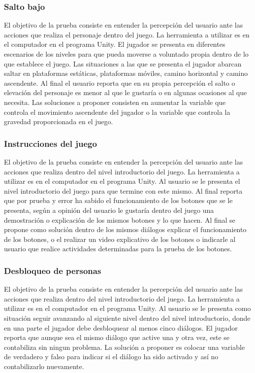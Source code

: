 \subsubsection{Salto bajo}
El objetivo de la prueba consiste en entender la percepción del usuario ante las acciones que realiza el personaje dentro del juego. La herramienta a utilizar es en el computador en el programa Unity. El jugador se presenta en diferentes escenarios de los niveles para que pueda moverse a voluntado propia dentro de lo que establece el juego. Las situaciones a las que se presenta el jugador abarcan saltar en plataformas estáticas, plataformas móviles, camino horizontal y camino ascendente. Al final el usuario reporta que en su propia percepción el salto o elevación del personaje es menor al que le gustaría o en algunas ocasiones al que necesita. Las soluciones a proponer consisten en aumentar la variable que controla el movimiento ascendente del jugador o la variable que controla la gravedad proporcionada en el juego.  
\subsubsection{Instrucciones del juego}
El objetivo de la prueba consiste en entender la percepción del usuario ante las acciones que realiza dentro del nivel introductorio del juego. La herramienta a utilizar es en el computador en el programa Unity. Al usuario se le presenta el nivel introductorio del juego para que termine con este mismo. Al final reporta que por prueba y error ha sabido el funcionamiento de los botones que se le presenta, según a opinión del usuario le gustaría dentro del juego una demostración o explicación de los mismos botones y lo que hacen. Al final se propone como solución dentro de los mismos diálogos explicar el funcionamiento de los botones, o el realizar un video explicativo de los botones o indicarle al usuario que realice actividades determinadas para la prueba de los botones. 
\subsubsection{Desbloqueo de personas}
El objetivo de la prueba consiste en entender la percepción del usuario ante las acciones que realiza dentro del nivel introductorio del juego. La herramienta a utilizar es en el computador en el programa Unity. Al usuario se le presenta como situación seguir avanzando al siguiente nivel dentro del nivel introductorio, donde en una parte el jugador debe desbloquear al menos cinco diálogos. El jugador reporta que aunque sea el mismo diálogo que active una y otra vez, este se contabiliza sin ningun problema. La solución a proponer es colocar una variable de verdadero y falso para indicar si el diálogo ha sido activado y así no contabilizarlo nuevamente.


